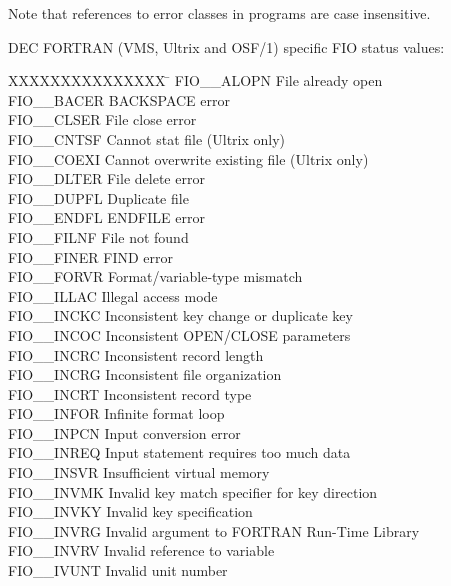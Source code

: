 Note that references to error classes in programs are case insensitive.

\newpage
DEC FORTRAN (VMS, Ultrix and OSF/1) specific FIO status values:

\begin{tabbing}
XXXXXXXXXXXXXXX \= \kill
FIO\_\_ALOPN \> File already open \\
FIO\_\_BACER \> BACKSPACE error \\
FIO\_\_CLSER \> File close error \\
FIO\_\_CNTSF \> Cannot stat file (Ultrix only) \\
FIO\_\_COEXI \> Cannot overwrite existing file (Ultrix only) \\
FIO\_\_DLTER \> File delete error \\
FIO\_\_DUPFL \> Duplicate file \\
FIO\_\_ENDFL \> ENDFILE error \\
FIO\_\_FILNF \> File not found \\
FIO\_\_FINER \> FIND error \\
FIO\_\_FORVR \> Format/variable-type mismatch \\
FIO\_\_ILLAC \footnotemark[1] \> Illegal access mode \\
FIO\_\_INCKC \> Inconsistent key change or duplicate key \\
FIO\_\_INCOC \> Inconsistent OPEN/CLOSE parameters \\
FIO\_\_INCRC \> Inconsistent record length \\
FIO\_\_INCRG \> Inconsistent file organization \\
FIO\_\_INCRT \> Inconsistent record type \\
FIO\_\_INFOR \> Infinite format loop \\
FIO\_\_INPCN \> Input conversion error \\
FIO\_\_INREQ \> Input statement requires too much data \\
FIO\_\_INSVR \> Insufficient virtual memory \\
FIO\_\_INVMK \> Invalid key match specifier for key direction \\
FIO\_\_INVKY \> Invalid key specification \\
FIO\_\_INVRG \> Invalid argument to FORTRAN Run-Time Library \\
FIO\_\_INVRV \> Invalid reference to variable \\
FIO\_\_IVUNT \footnotemark[1] \> Invalid unit number \\

\end{tabbing}
